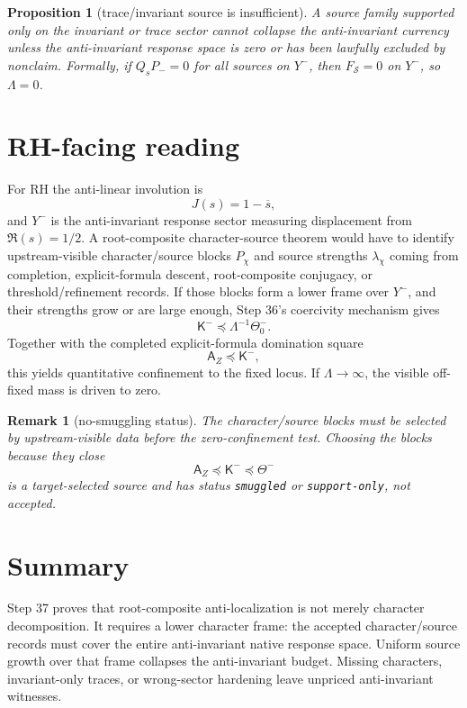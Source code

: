 \documentclass[11pt]{article}
\newtheorem{proposition}{Proposition}
\newtheorem{remark}{Remark}
\begin{document}
\begin{proposition}[trace/invariant source is insufficient]
A source family supported only on the invariant or trace sector cannot collapse the anti-invariant currency unless the anti-invariant response space is zero or has been lawfully excluded by nonclaim.  Formally, if \(Q_sP_-=0\) for all sources on \(Y^-\), then \(F_{\mathcal S}=0\) on \(Y^-\), so \(\Lambda=0\).
\end{proposition}

\section{RH-facing reading}
For RH the anti-linear involution is
\[
  J(s)=1-\overline{s},
\]
and \(Y^-\) is the anti-invariant response sector measuring displacement from \(\Re(s)=1/2\).  A root-composite character-source theorem would have to identify upstream-visible character/source blocks \(P_\chi\) and source strengths \(\lambda_\chi\) coming from completion, explicit-formula descent, root-composite conjugacy, or threshold/refinement records.  If those blocks form a lower frame over \(Y^-\), and their strengths grow or are large enough, Step 36's coercivity mechanism gives
\[
  \mathsf K^-\preceq \Lambda^{-1}\Theta^-_0.
\]
Together with the completed explicit-formula domination square
\[
  \mathsf A_Z\preceq \mathsf K^- ,
\]
this yields quantitative confinement to the fixed locus.  If \(\Lambda\to\infty\), the visible off-fixed mass is driven to zero.

\begin{remark}[no-smuggling status]
The character/source blocks must be selected by upstream-visible data before the zero-confinement test.  Choosing the blocks because they close
\[
  \mathsf A_Z\preceq\mathsf K^-\preceq\Theta^-
\]
is a target-selected source and has status \texttt{smuggled} or \texttt{support-only}, not accepted.
\end{remark}

\section{Summary}
Step 37 proves that root-composite anti-localization is not merely character decomposition.  It requires a lower character frame: the accepted character/source records must cover the entire anti-invariant native response space.  Uniform source growth over that frame collapses the anti-invariant budget.  Missing characters, invariant-only traces, or wrong-sector hardening leave unpriced anti-invariant witnesses.
\end{document}
